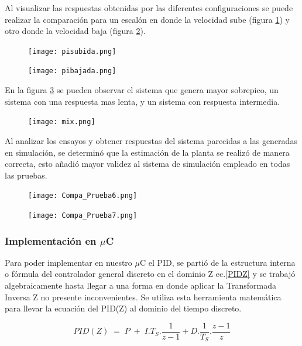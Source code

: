     Al visualizar las respuestas obtenidas por las diferentes configuraciones se puede realizar la comparación para un escalón en donde la velocidad sube (figura \ref{fig:pisubuda}) y otro donde la velocidad baja (figura \ref{fig:pibajada}).
    
    \begin{figure}[H]
    	\centering
    	\texttt{[image: pisubida.png]}
    	\label{fig:pisubuda}
    \end{figure}
    
    \begin{figure}[H]
    	\centering
    	\texttt{[image: pibajada.png]}
    	\label{fig:pibajada}
    \end{figure}
    
    
    En la figura \ref{fig:mix} se pueden observar el sistema que genera mayor sobrepico, un sistema con una respuesta mas lenta, y un sistema con respuesta intermedia. 
    \begin{figure}[h!]
    	\centering
    	\texttt{[image: mix.png]}
    	\label{fig:mix}
    \end{figure}

	Al analizar los ensayos y obtener respuestas del sistema parecidas a las generadas en simulación, se determinó que la estimación de la planta se realizó de manera correcta, esto añadió mayor validez al sistema de simulación empleado en todas las pruebas. 
	
	\begin{figure}[h!]
		\centering
		\texttt{[image: Compa\_Prueba6.png]}
		\label{fig:Prueba_6}
	\end{figure}   
\begin{figure}[h!]
	\centering
	\texttt{[image: Compa\_Prueba7.png]}
	\label{fig:Prueba_7}
\end{figure}   
    \subsubsection{Implementación en $\mu$C}
    
    Para poder implementar en nuestro $\mu$C  el PID, se partió de la estructura interna o fórmula del controlador general discreto en el dominio Z ec.\ref{PIDZ} y se trabajó algebraicamente hasta llegar a una forma en donde aplicar la Transformada Inversa Z no presente inconvenientes. Se utiliza esta herramienta matemática para llevar la ecuación del PID(Z) al dominio del tiempo discreto.
    
     \begin{equation}
    PID(Z)\;=\;P\;+\;I.T_S.\frac1{z-1}+D.\frac1{T_S}.\frac{z-1}z \label{PIDZ}
    \end{equation}
    \newpage